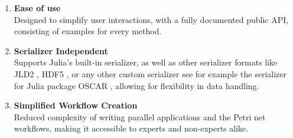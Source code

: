 \documentclass{juliacon}
\begin{document}
\begin{enumerate}
    \item \textbf{Ease of use}\\
          Designed to simplify user interactions, with a fully documented public API, consisting of examples for every method.\vskip 6pt
    \item \textbf{Serializer Independent}\\
          Supports Julia's built-in serializer, as well as other serializer formats like JLD2 \cite{JLD2}, HDF5 \cite{HDF5}, or any other custom serializer see for example the serializer for Julia package OSCAR \cite{OSCAR}, allowing for flexibility in data handling.\vskip 6pt
    \item \textbf{Simplified Workflow Creation}\\
          Reduced complexity of writing parallel applications and the Petri net workflows, making it accessible to experts and non-experts alike.\vskip 6pt
    

\end{enumerate}
\end{document}
